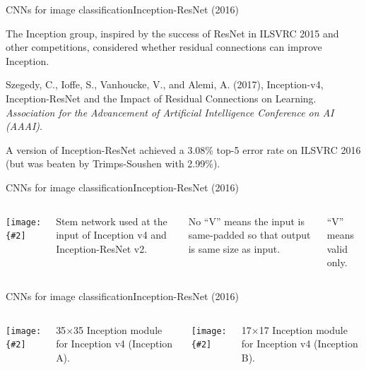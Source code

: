 \documentclass[aspectratio=169]{beamer}
\newcommand{\myfig}[3]{\centerline{\texttt{[image: \{\#2]}}}
\begin{document}
\begin{frame}{CNNs for image classification}{Inception-ResNet (2016)}

  The Inception group, inspired by the success of ResNet in ILSVRC 2015 and
  other competitions, considered whether residual connections can improve
  Inception.

  \medskip
  
  Szegedy, C., Ioffe, S., Vanhoucke, V., and Alemi, A. (2017),
  Inception-v4, Inception-ResNet and the Impact of Residual
  Connections on Learning. \textit{Association for the Advancement
    of Artificial Intelligence Conference on AI (AAAI)}.

  \medskip

  A version of Inception-ResNet achieved a 3.08\% top-5 error rate on
  ILSVRC 2016 (but was beaten by Trimps-Soushen with 2.99\%).

\end{frame}


\begin{frame}{CNNs for image classification}{Inception-ResNet (2016)}

  \begin{columns}
    
    \column{1.5in}

    \myfig{0.9in}{szegedy-16-fig3}{Szegedy et at.\ (2017), Fig.\ 3}

    \column{3in}

    Stem network used at the input of Inception v4 and
    Inception-ResNet v2.

    \medskip

    No ``V'' means the input is same-padded so that output is same
    size as input.

    \medskip

    ``V'' means valid only.
    
  \end{columns}
  
\end{frame}


\begin{frame}{CNNs for image classification}{Inception-ResNet (2016)}

  \begin{columns}

    \column{2.2in}
    
    \myfig{2in}{szegedy-16-fig4}{Szegedy et at.\ (2017), Fig.\ 4}

    \medskip

    35$\times$35 Inception module for Inception v4 (Inception A).

    \column{2.2in}
    
    \myfig{2in}{szegedy-16-fig5}{Szegedy et at.\ (2017), Fig.\ 5}

    \medskip

    17$\times$17 Inception module for Inception v4 (Inception B).

    \end{columns}

\end{frame}
\end{document}
